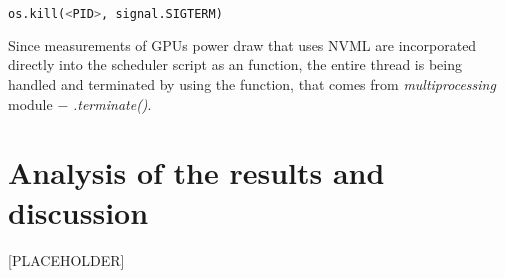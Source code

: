 \begin{lstlisting}[language=Python]
    os.kill(<PID>, signal.SIGTERM)
\end{lstlisting}

Since measurements of GPUs power draw that uses NVML are incorporated directly
into the scheduler script as an function, the entire thread is being handled
and terminated by using the function, that comes from \emph{multiprocessing}
module $-$ \emph{.terminate\@()}.

\section{Analysis of the results and discussion}

[PLACEHOLDER]

























































